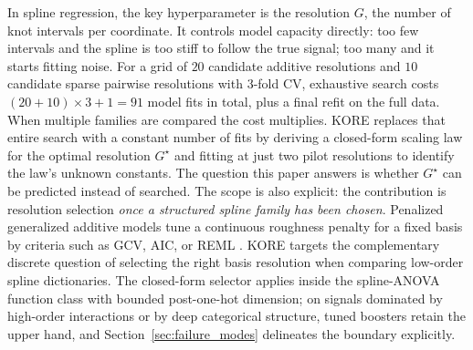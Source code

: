\documentclass{article}
\newcommand{\KORE}{\textsc{KORE}}
\begin{document}
In spline regression, the key hyperparameter is the resolution $G$, the number of knot intervals per coordinate. It controls model capacity directly: too few intervals and the spline is too stiff to follow the true signal; too many and it starts fitting noise. For a grid of $20$ candidate additive resolutions and $10$ candidate sparse pairwise resolutions with $3$-fold CV, exhaustive search costs $(20+10)\times 3 + 1 = 91$ model fits in total, plus a final refit on the full data. When multiple families are compared the cost multiplies. \KORE{} replaces that entire search with a constant number of fits by deriving a closed-form scaling law for the optimal resolution $G^\star$ and fitting at just two pilot resolutions to identify the law's unknown constants. The question this paper answers is whether $G^\star$ can be predicted instead of searched. The scope is also explicit: the contribution is resolution selection \emph{once a structured spline family has been chosen}. Penalized generalized additive models tune a continuous roughness penalty for a fixed basis by criteria such as GCV, AIC, or REML \citep{wood2017}. \KORE{} targets the complementary discrete question of selecting the right basis resolution when comparing low-order spline dictionaries. The closed-form selector applies inside the spline-ANOVA function class with bounded post-one-hot dimension; on signals dominated by high-order interactions or by deep categorical structure, tuned boosters retain the upper hand, and Section~\ref{sec:failure_modes} delineates the boundary explicitly.
\end{document}
